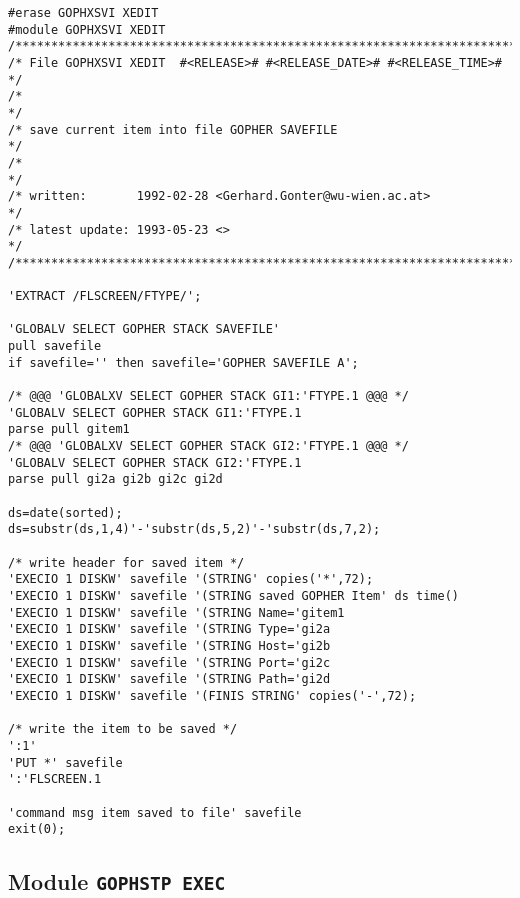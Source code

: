 \begin{verbatim}
#erase GOPHXSVI XEDIT
#module GOPHXSVI XEDIT
/***********************************************************************/
/* File GOPHXSVI XEDIT  #<RELEASE># #<RELEASE_DATE># #<RELEASE_TIME>#  */
/*                                                                     */
/* save current item into file GOPHER SAVEFILE                         */
/*                                                                     */
/* written:       1992-02-28 <Gerhard.Gonter@wu-wien.ac.at>            */
/* latest update: 1993-05-23 <>                                        */
/***********************************************************************/

'EXTRACT /FLSCREEN/FTYPE/';

'GLOBALV SELECT GOPHER STACK SAVEFILE'
pull savefile
if savefile='' then savefile='GOPHER SAVEFILE A';

/* @@@ 'GLOBALXV SELECT GOPHER STACK GI1:'FTYPE.1 @@@ */
'GLOBALV SELECT GOPHER STACK GI1:'FTYPE.1
parse pull gitem1
/* @@@ 'GLOBALXV SELECT GOPHER STACK GI2:'FTYPE.1 @@@ */
'GLOBALV SELECT GOPHER STACK GI2:'FTYPE.1
parse pull gi2a gi2b gi2c gi2d

ds=date(sorted);
ds=substr(ds,1,4)'-'substr(ds,5,2)'-'substr(ds,7,2);

/* write header for saved item */
'EXECIO 1 DISKW' savefile '(STRING' copies('*',72);
'EXECIO 1 DISKW' savefile '(STRING saved GOPHER Item' ds time()
'EXECIO 1 DISKW' savefile '(STRING Name='gitem1
'EXECIO 1 DISKW' savefile '(STRING Type='gi2a
'EXECIO 1 DISKW' savefile '(STRING Host='gi2b
'EXECIO 1 DISKW' savefile '(STRING Port='gi2c
'EXECIO 1 DISKW' savefile '(STRING Path='gi2d
'EXECIO 1 DISKW' savefile '(FINIS STRING' copies('-',72);

/* write the item to be saved */
':1'
'PUT *' savefile
':'FLSCREEN.1

'command msg item saved to file' savefile 
exit(0);
\end{verbatim}

\subsection{Module {\tt GOPHSTP EXEC}}

\def\LPtopD{Module {\tt GOPHSTP EXEC}}

\def\LPtopF{~}

